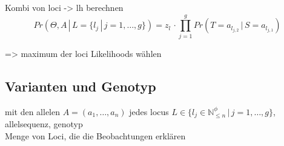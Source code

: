 Kombi von loci -> lh berechnen
\begin{equation} \label{eqn:2-21}
\tag{2-21}
Pr(\Theta,A \, | \, L=\{l_{j}\, |\, j=1,\dots,g\})=z_{l} \, \cdotp \prod_{j=1}^{g}Pr(T=a_{l_{j,2}} \, | \, S=a_{l_{j,1}})
\end{equation}

=> maximum der loci Likelihoods wählen
\subsection{Varianten und Genotyp} \label{subsec:sol_vcf}
mit den allelen $A = (a_{1}, \dots, a_{n})$ jedes locus $L \in \{l_{j} \in \mathds{N}_{\leq n}^\phi \, | \, j=1, \dots, g\}$, allelsequenz, genotyp\\
Menge von Loci, die die Beobachtungen erklären